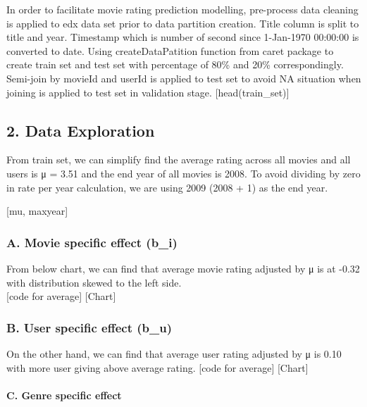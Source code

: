\documentclass[
]{article}
\begin{document}
In order to facilitate movie rating prediction modelling, pre-process
data cleaning is applied to edx data set prior to data partition
creation. Title column is split to title and year. Timestamp which is
number of second since 1-Jan-1970 00:00:00 is converted to date. Using
createDataPatition function from caret package to create train set and
test set with percentage of 80\% and 20\% correspondingly. Semi-join by
movieId and userId is applied to test set to avoid NA situation when
joining is applied to test set in validation stage.
{[}head(train\_set){]}

\hypertarget{data-exploration}{%
\subsection{2. Data Exploration}\label{data-exploration}}

From train set, we can simplify find the average rating across all
movies and all users is μ = 3.51 and the end year of all movies is 2008.
To avoid dividing by zero in rate per year calculation, we are using
2009 (2008 + 1) as the end year.

{[}mu, maxyear{]}

\hypertarget{a.-movie-specific-effect-b_i}{%
\subsubsection{A. Movie specific effect
(b\_i)}\label{a.-movie-specific-effect-b_i}}

From below chart, we can find that average movie rating adjusted by μ is
at -0.32 with distribution skewed to the left side.\\
{[}code for average{]} {[}Chart{]}

\hypertarget{b.-user-specific-effect-b_u}{%
\subsubsection{B. User specific effect
(b\_u)}\label{b.-user-specific-effect-b_u}}

On the other hand, we can find that average user rating adjusted by μ is
0.10 with more user giving above average rating. {[}code for average{]}
{[}Chart{]}

\hypertarget{c.-genre-specific-effect}{%
\paragraph{C. Genre specific effect}\label{c.-genre-specific-effect}}
\end{document}
